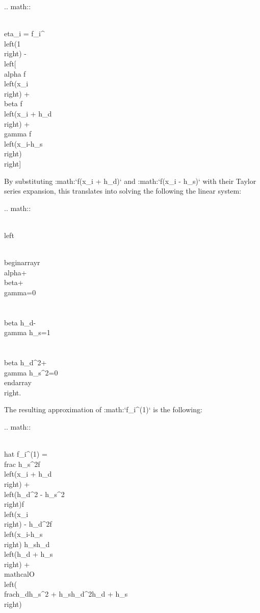 \begin{DoxyVerb}
.. math::

    \\eta_{i} = f_{i}^{\\left(1\\right)} -
                \\left[ \\alpha f\\left(x_{i}\\right) +
                        \\beta f\\left(x_{i} + h_{d}\\right) +
                        \\gamma f\\left(x_{i}-h_{s}\\right)
                \\right]

By substituting :math:`f(x_{i} + h_{d})` and :math:`f(x_{i} - h_{s})`
with their Taylor series expansion, this translates into solving
the following the linear system:

.. math::

    \\left\\{
        \\begin{array}{r}
            \\alpha+\\beta+\\gamma=0 \\\\
            \\beta h_{d}-\\gamma h_{s}=1 \\\\
            \\beta h_{d}^{2}+\\gamma h_{s}^{2}=0
        \\end{array}
    \\right.

The resulting approximation of :math:`f_{i}^{(1)}` is the following:

.. math::

    \\hat f_{i}^{(1)} =
        \\frac{
            h_{s}^{2}f\\left(x_{i} + h_{d}\\right)
            + \\left(h_{d}^{2} - h_{s}^{2}\\right)f\\left(x_{i}\\right)
            - h_{d}^{2}f\\left(x_{i}-h_{s}\\right)}
            { h_{s}h_{d}\\left(h_{d} + h_{s}\\right)}
        + \\mathcal{O}\\left(\\frac{h_{d}h_{s}^{2}
                            + h_{s}h_{d}^{2}}{h_{d}
                            + h_{s}}\\right)

}
\end{DoxyVerb}
